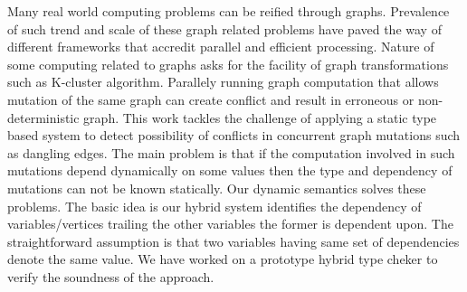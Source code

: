 Many real world computing problems can be reified through graphs. Prevalence of such trend and scale of these graph related problems have paved the way of different frameworks that accredit parallel and efficient processing. Nature of some computing related to graphs asks for the facility of graph transformations such as K-cluster algorithm. Parallely running graph computation that allows mutation of the same graph can create conflict and result in erroneous or non-deterministic graph. This work tackles the challenge of applying a static type based system to detect possibility of conflicts in concurrent graph mutations such as dangling edges. The main problem is that if the computation involved in such mutations depend dynamically on some values then the type and dependency of mutations can not be known statically. Our dynamic semantics solves these problems. The basic idea is our hybrid system identifies the dependency of variables/vertices trailing the other variables the former is dependent upon. The straightforward assumption is that two variables having same set of dependencies denote the same value. We have worked on a prototype hybrid type cheker to verify the soundness of the approach.  